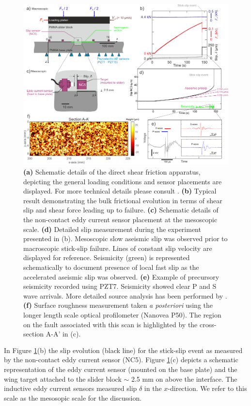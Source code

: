 \documentclass[preprint,1p, 10pt,authoryear]{elsarticle}
\begin{document}
\begin{figure}
 	\centering
 	\includegraphics{FIG1_revised.pdf} 
 	\caption{ \textbf{(a)} Schematic details of the direct shear friction apparatus, depicting the general loading conditions and sensor placements are displayed. For more technical details please consult \citet{Selvadurai2015, Selvadurai2015a}. \textbf{(b)} Typical result demonstrating the bulk frictional evolution in terms of shear slip and shear force leading up to failure. \textbf{(c)} Schematic details of the non-contact eddy current sensor placement at the mesoscopic scale. \textbf{(d)} Detailed slip measurement during the experiment presented in (b).  Mesoscopic slow aseismic slip was observed prior to macroscopic stick-slip failure.  Lines of constant slip velocity are displayed for reference.  Seismicity (green) is represented schematically to document presence of local fast slip as the accelerated aseismic slip was observed. \textbf{(e)}  Example of precursory seismicity recorded using PZT7.  Seismicity showed clear P and S wave arrivals. More detailed source analysis has been performed by \citet{Selvadurai2019}. \textbf{(f)} Surface roughness measurement taken \textit{a posteriori} using the longer length scale optical profilometer (Nanovea P50).  The region on the fault associated with this scan is highlighted by the cross-section A-A’ in (c).}
 	\label{fig1}
 \end{figure}
In Figure \ref{fig1}(b) the slip evolution (black line) for the stick-slip event as measured by the non-contact eddy current sensor (NC5).  Figure \ref{fig1}(c) depicts a schematic representation of the eddy current sensor (mounted on the base plate) and the wing target attached to the slider block $\sim$ 2.5 mm on above the interface.  The inductive eddy current sensors measured slip $\delta$ in the $x$-direction. We refer to this scale as the mesosopic scale for the discussion.
 
\end{document}
